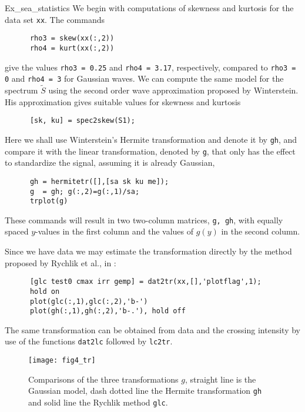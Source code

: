 \begin{cex}{Ex_sea_statistics}
We begin with computations of skewness and kurtosis
for the data set {\tt xx}. The commands
{\small\begin{verbatim}
      rho3 = skew(xx(:,2))
      rho4 = kurt(xx(:,2))
\end{verbatim}}
\noindent
give the values {\tt rho3 = 0.25} and {\tt  rho4 = 3.17},
respectively, compared to {\tt rho3 = 0} and  {\tt rho4 = 3}
for Gaussian waves. We can compute the same model for
the spectrum $\tilde S$ using the second order wave approximation
proposed by Winterstein. His approximation gives suitable
values for skewness and kurtosis
{\small\begin{verbatim}
      [sk, ku] = spec2skew(S1);
\end{verbatim}}

Here we shall use Winterstein's Hermite transformation
and denote it by {\tt gh},
and compare it with the linear transformation, denoted by {\tt g}, that
only has the effect to standardize the signal, assuming it is already Gaussian,
{\small\begin{verbatim}
      gh = hermitetr([],[sa sk ku me]);
      g  = gh; g(:,2)=g(:,1)/sa;
      trplot(g)
\end{verbatim}}
\noindent These commands will result in two two-column matrices,
{\tt g, gh}, with equally spaced $y$-values in the first column
and the values of $g(y)$ in the second column.

Since we have data we may estimate the transformation directly by the method
proposed by Rychlik et al., in \cite{RychlikEtal1997Modelling}:
{\small\begin{verbatim}
      [glc test0 cmax irr gemp] = dat2tr(xx,[],'plotflag',1);
      hold on
      plot(glc(:,1),glc(:,2),'b-')
      plot(gh(:,1),gh(:,2),'b-.'), hold off
\end{verbatim}}
\noindent The same transformation can be obtained from data 
and the crossing intensity by use of the \progname{} functions  
{\tt dat2lc} followed by 
{\tt lc2tr}.

\begin{figure}[thb]
\centering
\texttt{[image: fig4\_tr]}
\vspace{-3mm}
\caption[Comparison of data transformations]{%
Comparisons of the three transformations $g$,
straight line is the Gaussian model,
dash dotted line the Hermite transformation {\tt gh} and solid line the
Rychlik method {\tt glc}.}
  \label{fig4_tr}
\end{figure}


\end{cex}
